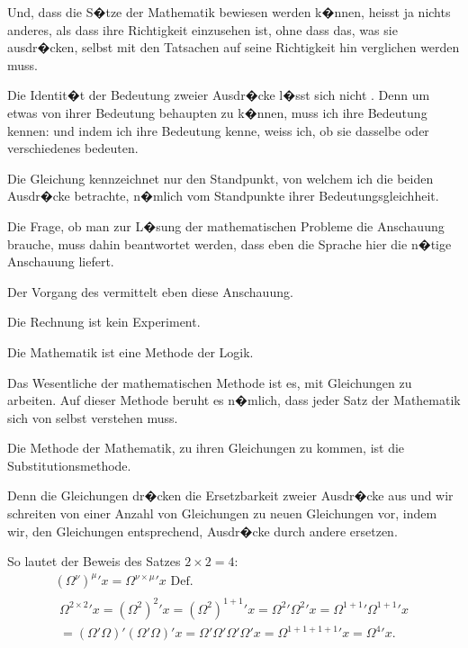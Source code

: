 {Und, dass die S�tze der Mathematik bewiesen
werden k�nnen, heisst ja nichts anderes, als dass
ihre Richtigkeit einzusehen ist, ohne dass das, was
sie ausdr�cken, selbst mit den Tatsachen auf seine
Richtigkeit hin verglichen werden muss.}


{Die Identit�t der Bedeutung zweier Ausdr�cke
l�sst sich nicht . Denn um etwas von
ihrer Bedeutung behaupten zu k�nnen, muss ich
ihre Bedeutung kennen: und indem ich ihre Bedeutung
kenne, weiss ich, ob sie dasselbe oder
verschiedenes bedeuten.}


{Die Gleichung kennzeichnet nur den Standpunkt,
von welchem ich die beiden Ausdr�cke
betrachte, n�mlich vom Standpunkte ihrer Bedeutungsgleichheit.}


{Die Frage, ob man zur L�sung der mathematischen
Probleme die Anschauung brauche, muss
dahin beantwortet werden, dass eben die Sprache
hier die n�tige Anschauung liefert.}


{Der Vorgang des  vermittelt eben
diese Anschauung.

Die Rechnung ist kein Experiment.}


{Die Mathematik ist eine Methode der Logik.}


{Das Wesentliche der mathematischen Methode
ist es, mit Gleichungen zu arbeiten. Auf dieser
Methode beruht es n�mlich, dass jeder Satz der
Mathematik sich von selbst verstehen muss.}


{Die Methode der Mathematik, zu ihren Gleichungen
zu kommen, ist die Substitutionsmethode.

{\verystretchyspace
Denn die Gleichungen dr�cken die Ersetzbarkeit
zweier Ausdr�cke aus und wir schreiten von einer
Anzahl von Gleichungen zu neuen Gleichungen
vor, indem wir, den Gleichungen entsprechend,
Ausdr�cke durch andere ersetzen.}}


{So lautet der Beweis des Satzes $2 \times 2 = 4$:
\begin{gather*}
(\Omega^{\nu})^{\mu}{}'x = \Omega^{\nu \times \mu}{}'x \text{ Def.}\\
\begin{split}
\Omega^{2 \times 2}{}'x = (\Omega^{2})^{2}{}'x = (\Omega^{2})^{1 + 1}{}'x = \Omega^{2}{}'\Omega^{2}{}'x = \Omega^{1 + 1}{}'\Omega^{1 + 1}{}'x\\
= (\Omega'\Omega)'(\Omega'\Omega)'x = \Omega'\Omega'\Omega'\Omega'x = \Omega^{1 + 1 + 1 + 1}{}'x = \Omega^{4}{}'x.
\end{split}
\end{gather*}
}


